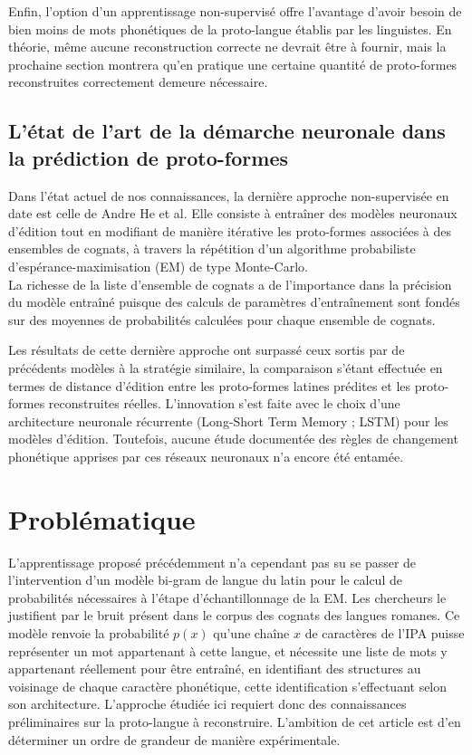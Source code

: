 \documentclass[10pt, french]{article}
\begin{document}
\begin{multicols*}{2}
Enfin, l'option d'un apprentissage non-supervisé offre l'avantage d'avoir besoin de bien 
moins de mots phonétiques de la proto-langue établis par les linguistes. En théorie, même 
aucune reconstruction correcte ne devrait être à fournir, mais la prochaine section montrera 
qu'en pratique une certaine quantité de proto-formes reconstruites correctement demeure nécessaire.


\subsection{L'état de l'art de la démarche neuronale dans la prédiction de proto-formes}
Dans l'état actuel de nos connaissances, la dernière approche non-supervisée en date est 
celle de Andre He et al. Elle consiste à entraîner des modèles neuronaux d'édition tout en 
modifiant de manière itérative les proto-formes associées à des ensembles de cognats, à 
travers la répétition d'un algorithme probabiliste d'espérance-maximisation (EM) 
de type Monte-Carlo.\\
La richesse de la liste d'ensemble de cognats a de l'importance dans la précision du modèle 
entraîné puisque des calculs de paramètres d'entraînement sont fondés sur des moyennes de probabilités 
calculées pour chaque ensemble de cognats.


Les résultats de cette dernière approche ont surpassé ceux sortis par de précédents modèles à la stratégie 
similaire, la comparaison s'étant effectuée en termes de distance d'édition entre les proto-formes latines 
prédites et les proto-formes reconstruites réelles. L'innovation s'est faite avec le choix d'une architecture 
neuronale récurrente (Long-Short Term Memory ; LSTM) pour les modèles d'édition. Toutefois, 
aucune étude documentée des règles de changement phonétique apprises par ces réseaux neuronaux 
n'a encore été entamée.\cite{andre}

\section{Problématique}

L'apprentissage proposé précédemment n'a cependant pas su se passer de l'intervention d'un modèle bi-gram de langue du latin pour le calcul de probabilités nécessaires à l'étape d'échantillonnage de la EM. Les chercheurs le justifient par le bruit présent dans le corpus des cognats des langues romanes.\cite{andre} Ce modèle renvoie la probabilité $p(x)$ qu'une chaîne $x$ de caractères de l'IPA puisse représenter un mot appartenant à cette langue, et nécessite une liste de mots y appartenant réellement pour être entraîné, en identifiant des structures au voisinage de chaque caractère phonétique, cette identification s'effectuant selon son architecture.\cite{jurafsky_ngram} L'approche étudiée ici requiert donc des connaissances préliminaires sur la proto-langue à reconstruire. L'ambition de cet article est d'en déterminer un ordre de grandeur de manière expérimentale.


\end{multicols*}
\end{document}
